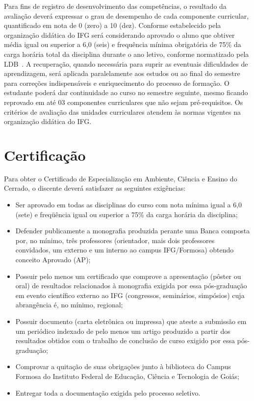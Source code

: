 \documentclass[11pt,fleqn]{book} %
\begin{document}
Para fins de registro de desenvolvimento das competências, o resultado da avaliação deverá expressar o grau de desempenho de cada componente curricular, quantificado em nota de 0 (zero) a 10 (dez). 
Conforme estabelecido pela organização didática do IFG será considerando aprovado o aluno que obtiver média igual ou superior a 6,0 (seis) e frequência mínima obrigatória de 75\% da carga horária total da disciplina durante o ano letivo, conforme normatizado pela LDB~\cite{Lei19394De1996}.
A recuperação, quando necessária para suprir as eventuais dificuldades de aprendizagem, será aplicada paralelamente aos estudos ou ao final do semestre para correções indispensáveis e enriquecimento do processo de formação. 
O estudante poderá dar continuidade ao curso no semestre seguinte, mesmo ficando reprovado em até 03 componentes curriculares que não sejam pré-requisitos. 
Os critérios de avaliação das unidades curriculares atendem às normas vigentes na organização didática do IFG.


\section{Certificação}
\indent

Para obter o Certificado de Especialização em Ambiente, Ciência e Ensino do Cerrado, o discente deverá satisfazer as seguintes exigências:
\begin{itemize}
	\item Ser aprovado em todas as disciplinas do curso com nota mínima igual a 6,0 (sete) e freqüência igual ou superior a 75\% da carga horária da disciplina;
	\item Defender publicamente a monografia produzida perante uma Banca composta por, no mínimo, três professores (orientador, mais dois professores convidados, um externo e um interno ao campus IFG/Formosa) obtendo conceito Aprovado (AP);
	\item Possuir pelo menos um certificado que comprove a apresentação (pôster ou oral) de resultados relacionados à monografia exigida por essa pós-graduação em evento científico externo ao IFG (congressos, seminários, simpósios) cuja abrangência é, no mínimo, regional;
	\item Possuir documento (carta eletrônica ou impressa) que ateste a submissão em um periódico indexado de pelo menos um artigo produzido a partir dos resultados obtidos com o trabalho de conclusão de curso exigido por essa pós-graduação;
	\item Comprovar a quitação de suas obrigações junto à biblioteca do Campus Formosa do Instituto Federal de Educação, Ciência e Tecnologia de Goiás;
	\item Entregar toda a documentação exigida pelo processo seletivo.
\end{itemize}
\end{document}
